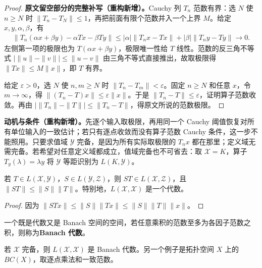\documentclass[../../main.tex]{subfiles}
\begin{document}
\begin{proof}
\textbf{原文留空部分的完整补写（重构新增）。}Cauchy 列 $T_n$ 范数有界：选 $N$ 使 $n\ge N$ 时 $\|T_n-T_N\|\le1$，再把前面有限个范数并入一个上界 $M$。给定 $x,y,\alpha,\beta$，有
\begin{align*}
\|T_n(\alpha x+\beta y)-\alpha Tx-\beta Ty\|
\le |\alpha|\|T_nx-Tx\|+|\beta|\|T_ny-Ty\|\longrightarrow0.
\end{align*}
左侧第一项的极限也为 $T(\alpha x+\beta y)$，极限唯一性给 $T$ 线性。范数的反三角不等式 $|\|u\|-\|v\||\le\|u-v\|$ 由三角不等式直接推出，故取极限得 $\|Tx\|\le M\|x\|$，即 $T$ 有界。

给定 $\varepsilon>0$，选 $N$ 使 $n,m\ge N$ 时 $\|T_n-T_m\|<\varepsilon$。固定 $n\ge N$ 和任意 $x$，令 $m\to\infty$，得 $\|(T_n-T)x\|\le\varepsilon\|x\|$。于是 $\|T_n-T\|\le\varepsilon$，证明算子范数收敛。再由 $|\|T_n\|-\|T\||\le\|T_n-T\|$，得原文所说的范数极限。
\end{proof}
\begin{remark}
\textbf{动机与条件（重构新增）。}先逐个输入取极限，再用同一个 Cauchy 阈值恢复对所有单位输入的一致估计；若只有逐点收敛而没有算子范数 Cauchy 条件，这一步不能照用。只要求值域 $\mathcal Y$ 完备，是因为所有实际取极限的 $T_nx$ 都在那里；定义域无需完备。若希望对任意定义域都成立，值域完备也不可省去：取 $\mathcal X=K$，算子 $T_y(\lambda)=\lambda y$ 将 $\mathcal Y$ 等距识别为 $L(K,\mathcal Y)$。
\end{remark}
\begin{proposition}\label{proposition:ch05-operator-composition}
若 $T\in L(\mathcal X,\mathcal Y)$，$S\in L(\mathcal Y,\mathcal Z)$，则 $ST\in L(\mathcal X,\mathcal Z)$，且 $\|ST\|\le\|S\|\|T\|$。特别地，$L(\mathcal X,\mathcal X)$ 是一个代数。
\end{proposition}
\begin{proof}
因为 $\|STx\|\le\|S\|\|Tx\|\le\|S\|\|T\|\|x\|$。
\end{proof}
\begin{definition}[Banach 代数]\label{definition:ch05-banach-algebra}
一个既是代数又是 Banach 空间的空间，若任意乘积的范数至多为各因子范数之积，则称为\textbf{Banach 代数}。
\end{definition}
\begin{example}\label{example:ch05-banach-algebras}
若 $\mathcal X$ 完备，则 $L(\mathcal X,\mathcal X)$ 是 Banach 代数。另一个例子是拓扑空间 $X$ 上的 $BC(X)$，取逐点乘法和一致范数。
\end{example}
\end{document}
